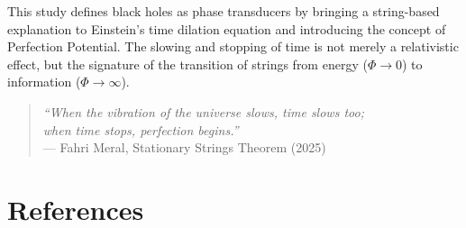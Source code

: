 \documentclass[12pt,a4paper]{article}
\begin{document}
This study defines black holes as phase transducers by bringing a string-based explanation to Einstein's time dilation equation and introducing the concept of Perfection Potential.
The slowing and stopping of time is not merely a relativistic effect, but the signature of the transition of strings from energy ($\Phi \to 0$) to information ($\Phi \to \infty$).

\begin{quote}
\textit{``When the vibration of the universe slows, time slows too;\\
when time stops, perfection begins.''}\\
--- Fahri Meral, Stationary Strings Theorem (2025)
\end{quote}

\section*{References}
\end{document}
